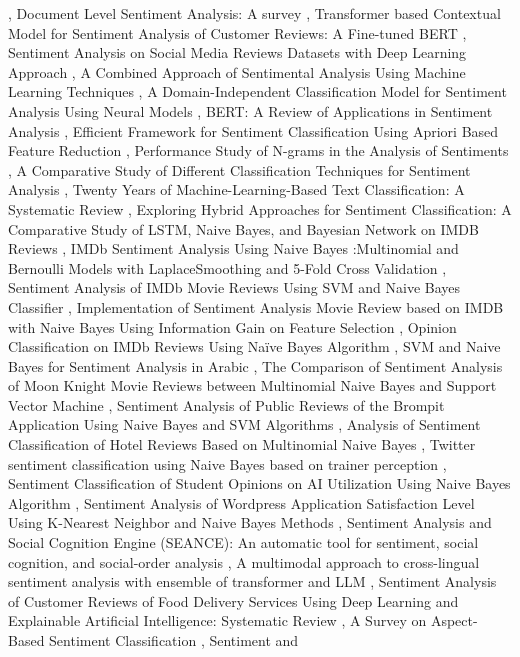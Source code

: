 \documentclass{article}
\begin{document}
\cite{umarani2021sentiment5263777e}, Document Level Sentiment Analysis: A survey \cite{behdenna2018document0f28a934}, Transformer based Contextual Model for Sentiment Analysis of Customer Reviews: A Fine-tuned BERT \cite{durairaj2021transformer24fb64c1}, Sentiment Analysis on Social Media Reviews Datasets with Deep Learning Approach \cite{baarslan2021sentimentfa026eca}, A Combined Approach of Sentimental Analysis Using Machine Learning Techniques \cite{gupta2023combined9632e9b1}, A Domain-Independent Classification Model for Sentiment Analysis Using Neural Models \cite{jnoub2020domainindependentbc6a4e2b}, BERT: A Review of Applications in Sentiment Analysis \cite{sayeed2023bert678d1641}, Efficient Framework for Sentiment Classification Using Apriori Based Feature Reduction \cite{jain2018efficientdf1b7bd2}, Performance Study of N-grams in the Analysis of Sentiments \cite{ojo2021performanceb18b3098}, A Comparative Study of Different Classification Techniques for Sentiment Analysis \cite{ghosh2020comparative0d185490}, Twenty Years of Machine-Learning-Based Text Classification: A Systematic Review \cite{palanivinayagam2023twentyf98b0ff7}, Exploring Hybrid Approaches for Sentiment Classification: A Comparative Study of LSTM, Naive Bayes, and Bayesian Network on IMDB Reviews \cite{reddy2025exploringf74fbe8e}, IMDb Sentiment Analysis Using Naive Bayes :Multinomial and Bernoulli Models with LaplaceSmoothing and 5-Fold Cross Validation \cite{mishra2025imdb53a34975}, Sentiment Analysis of IMDb Movie Reviews Using SVM and Naive Bayes Classifier \cite{subedi2025sentiment4d1e1933}, Implementation of Sentiment Analysis Movie Review based on IMDB with Naive Bayes Using Information Gain on Feature Selection \cite{mahyarani2021implementation92725ed4}, Opinion Classification on IMDb Reviews Using Naïve Bayes Algorithm \cite{putri2025opinion5a9abee2}, SVM and Naive Bayes for Sentiment Analysis in Arabic \cite{mohamed2022svm467a111d}, The Comparison of Sentiment Analysis of Moon Knight Movie Reviews between Multinomial Naive Bayes and Support Vector Machine \cite{paperndcomparisoneeaa2824}, Sentiment Analysis of Public Reviews of the Brompit Application Using Naive Bayes and SVM Algorithms \cite{affandi2026sentimentc63a31c8}, Analysis of Sentiment Classification of Hotel Reviews Based on Multinomial Naive Bayes \cite{zhirui2020analysis7e9df95c}, Twitter sentiment classification using Naive Bayes based on trainer perception \cite{ibrahim2015twitter8ea1c52b}, Sentiment Classification of Student Opinions on AI Utilization Using Naive Bayes Algorithm \cite{yuniar2025sentimentaf01069c}, Sentiment Analysis of Wordpress Application Satisfaction Level Using K-Nearest Neighbor and Naive Bayes Methods \cite{hamid2025sentimente313680b}, Sentiment Analysis and Social Cognition Engine (SEANCE): An automatic tool for sentiment, social cognition, and social-order analysis \cite{crossley2016sentimente6f85bf3}, A multimodal approach to cross-lingual sentiment analysis with ensemble of transformer and LLM \cite{miah2024multimodal6ed04e56}, Sentiment Analysis of Customer Reviews of Food Delivery Services Using Deep Learning and Explainable Artificial Intelligence: Systematic Review \cite{adak2022sentiment1dd3a5fa}, A Survey on Aspect-Based Sentiment Classification \cite{brauwers2021survey18bf5cde}, Sentiment and 
\end{document}
